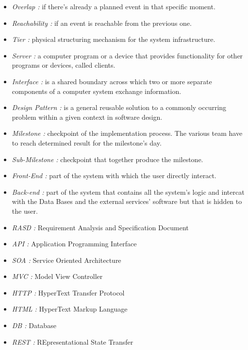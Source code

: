 \newpage
{}
\begin{itemize}
	\item \emph{Overlap :} if there’s already a planned event in that specific moment.
	\item \emph{Reachability :} if an event is reachable from the previous one.
	\item \emph{Tier :} physical structuring mechanism for the system infrastructure.
	\item \emph{Server :} a computer program or a device that provides functionality for other programs or devices, called clients.
	\item \emph{Interface :} is a shared boundary across which two or more separate components of a computer system exchange information.
	\item \emph{Design Pattern :} is a general reusable solution to a commonly occurring problem within a given context in software design.
	\item \emph{Milestone :} checkpoint of the implementation process. The various team have to reach determined result for the milestone's day.
	\item \emph{Sub-Milestone :} checkpoint that together produce the milestone.
	\item \emph{Front-End :} part of the system with which the user directly interact.
	\item \emph{Back-end :} part of the system that contains all the system's logic and intercat with the Data Bases and the external services' software but that is hidden to the user.
\end{itemize}

\begin{itemize}
	\setlength{\leftskip}{0.5cm}
	\item \emph{RASD :} Requirement Analysis and Specification Document
	\item \emph{API :} Application Programming Interface
	\item \emph{SOA :} Service Oriented Architecture
	\item \emph{MVC :} Model View Controller
	\item \emph{HTTP :} HyperText Transfer Protocol
	\item \emph{HTML :} HyperText Markup Language
	\item \emph{DB :} Database
	\item \emph{REST :} REpresentational State Transfer
\end{itemize}


